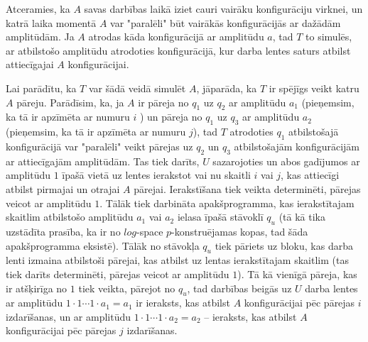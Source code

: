 \documentclass{ludis}
\begin{document}
Atceramies, ka $A$ savas darbības laikā iziet cauri vairāku konfigurāciju virknei, un katrā laika momentā $A$ var "paralēli" būt vairākās konfigurācijās ar dažādām amplitūdām. %
Ja $A$ atrodas kāda konfigurācijā ar amplitūdu $a$, tad $T$ to simulēs, ar atbilstošo amplitūdu atrodoties konfigurācijā, kur darba lentes saturs atbilst attiecīgajai $A$ konfigurācijai.

Lai parādītu, ka $T$ var šādā veidā simulēt $A$, jāparāda, ka $T$ ir spējīgs veikt katru $A$ pāreju. Parādīsim, ka, ja $A$ ir pāreja no $q_1$ uz $q_2$ ar amplitūdu $a_1$ (pieņemsim, ka tā ir apzīmēta ar numuru $i$ ) un pāreja no $q_1$ uz $q_3$ ar amplitūdu $a_2$ (pieņemsim, ka tā ir apzīmēta ar numuru $j$), tad $T$ atrodoties $q_1$ atbilstošajā konfigurācijā var "paralēli" veikt pārejas uz $q_2$ un $q_3$ atbilstošajām konfigurācijām ar attiecīgajām amplitūdām. Tas tiek darīts, $U$ sazarojoties un abos gadījumos ar amplitūdu $1$ īpašā vietā uz lentes ierakstot vai nu skaitli $i$ vai $j$, kas attiecīgi atbilst pirmajai un otrajai $A$ pārejai. Ierakstīšana tiek veikta determinēti, pārejas veicot ar amplitūdu $1$. Tālāk tiek darbināta apakšprogramma, kas ierakstītajam skaitlim atbilstošo amplitūdu $a_1$ vai $a_2$ ielasa īpašā stāvoklī $q_u$ (tā kā tika uzstādīta prasība, ka ir no $log$-space $p$-konstruējamas kopas, tad šāda apakšprogramma eksistē). Tālāk no stāvokļa $q_u$ tiek pāriets uz bloku, kas darba lenti izmaina atbilstoši pārejai, kas atbilst uz lentas ierakstītajam skaitlim (tas tiek darīts determinēti, pārejas veicot ar amplitūdu $1$). Tā kā vienīgā pāreja, kas ir atšķirīga no $1$ tiek veikta, pārejot no $q_u$, tad darbības beigās uz $U$ darba lentes ar amplitūdu $1 \cdot 1 \cdots 1 \cdot a_1 = a_1$ ir ieraksts, kas atbilst $A$ konfigurācijai pēc pārejas $i$ izdarīšanas, un ar amplitūdu $1 \cdot 1 \cdots 1 \cdot a_2 = a_2$ -- ieraksts, kas atbilst $A$ konfigurācijai pēc pārejas $j$ izdarīšanas.

\end{document}
